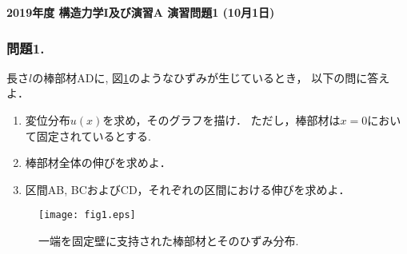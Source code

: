 \documentclass[10pt,a4j]{jarticle}
\newlength{\minitwocolumn}
\begin{document}
\newcommand{\fat}[1]{\mbox{\boldmath $#1$}}
\newcommand{\D}{\partial}
\newcommand{\w}{\omega}
\newcommand{\ga}{\alpha}
\newcommand{\gb}{\beta}
\newcommand{\gx}{\xi}
\newcommand{\gz}{\zeta}
\newcommand{\vhat}[1]{\hat{\fat{#1}}}
\newcommand{\spc}{\vspace{0.7\baselineskip}}
\newcommand{\halfspc}{\vspace{0.3\baselineskip}}

\pagestyle{empty}
\newcommand{\twofig}[2]
 {
   \begin{figure}
     \begin{minipage}[t]{\minitwocolumn}
         \begin{center}   #1
         \end{center}
     \end{minipage}
         \hspace{\columnsep}
     \begin{minipage}[t]{\minitwocolumn}
         \begin{center} #2
         \end{center}
     \end{minipage}
   \end{figure}
 }
\begin{center}
	{\Large \bf 2019年度 構造力学I及び演習A 演習問題1 (10月1日)} \\
\end{center}
\subsubsection*{問題1.}
長さ$l$の棒部材ADに, 図\ref{fig:fig1}のようなひずみが生じているとき，
以下の問に答えよ．
\begin{enumerate}
\item
	変位分布$u(x)$を求め，そのグラフを描け．
	ただし，棒部材は$x=0$において固定されているとする.
\item
	棒部材全体の伸びを求めよ．
\item
	区間AB, BCおよびCD，それぞれの区間における伸びを求めよ．
\end{enumerate}
\begin{figure}[h]
	\vspace{-3mm}
	\begin{center}
	\texttt{[image: fig1.eps]} 
	\end{center}
	\vspace{-5mm}
	\caption{一端を固定壁に支持された棒部材とそのひずみ分布.} 
	\label{fig:fig1}
\end{figure}
	\vspace{-5mm}
\end{document}
